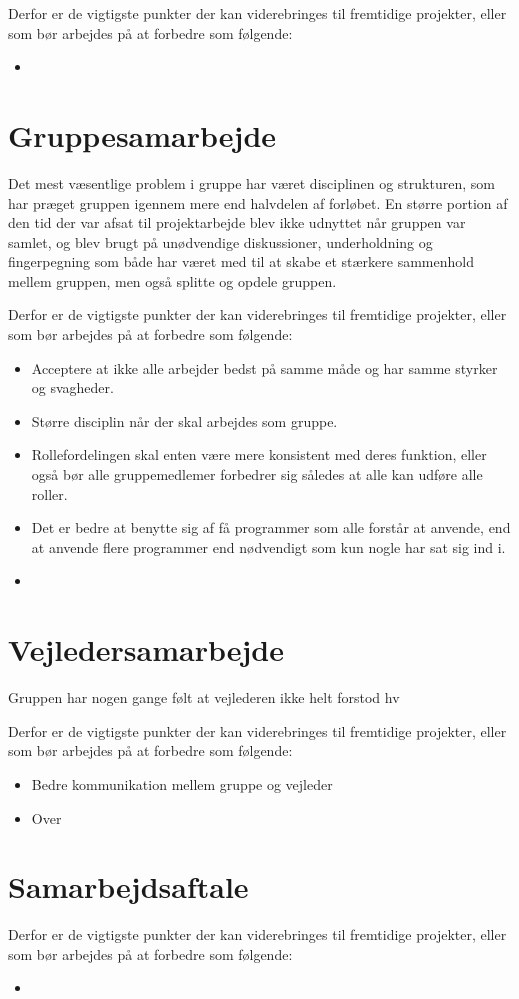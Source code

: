 Derfor er de vigtigste punkter der kan viderebringes til fremtidige projekter, eller som bør arbejdes på at forbedre som følgende:

\begin{itemize}
\item
\end{itemize}

\section{Gruppesamarbejde}
Det mest væsentlige problem i gruppe har været disciplinen og strukturen, som har præget gruppen igennem mere end halvdelen af forløbet. En større portion af den tid der var afsat til projektarbejde blev ikke udnyttet når gruppen var samlet, og blev brugt på unødvendige diskussioner, underholdning og fingerpegning som både har været med til at skabe et stærkere sammenhold mellem gruppen, men også splitte og opdele gruppen.

Derfor er de vigtigste punkter der kan viderebringes til fremtidige projekter, eller som bør arbejdes på at forbedre som følgende:

\begin{itemize}
\item Acceptere at ikke alle arbejder bedst på samme måde og har samme styrker og svagheder.
\item Større disciplin når der skal arbejdes som gruppe.
\item Rollefordelingen skal enten være mere konsistent med deres funktion, eller også bør alle gruppemedlemer forbedrer sig således at alle kan udføre alle roller.
\item Det er bedre at benytte sig af få programmer som alle forstår at anvende, end at anvende flere programmer end nødvendigt som kun nogle har sat sig ind i.
\item 
\end{itemize}

\section{Vejledersamarbejde}

Gruppen har nogen gange følt at vejlederen ikke helt forstod hv

Derfor er de vigtigste punkter der kan viderebringes til fremtidige projekter, eller som bør arbejdes på at forbedre som følgende:

\begin{itemize}
\item Bedre kommunikation mellem gruppe og vejleder
\item Over
\end{itemize}

\section{Samarbejdsaftale}

Derfor er de vigtigste punkter der kan viderebringes til fremtidige projekter, eller som bør arbejdes på at forbedre som følgende:

\begin{itemize}
\item
\end{itemize}